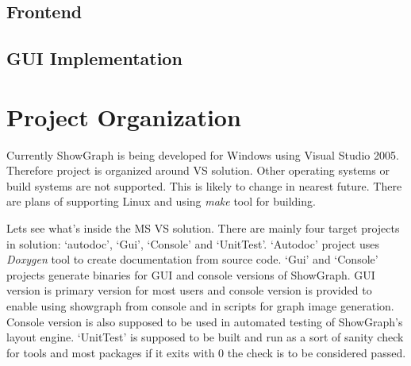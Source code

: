 \documentclass[11pt,twoside,a4paper]{article}
\begin{document}

\subsection{Frontend}


\subsection{GUI Implementation}


\section{Project Organization}
Currently ShowGraph is being developed for Windows using Visual Studio 2005. Therefore project is organized around VS solution. Other operating systems or build systems are not supported. This is likely to change in nearest future. There are plans of supporting Linux and using \emph{make} tool for building.

Lets see what's inside the MS VS solution. There are mainly four target projects in solution: `autodoc', `Gui', `Console' and `UnitTest'. `Autodoc' project uses \emph{Doxygen} tool to create documentation from source code. `Gui' and `Console' projects generate binaries for GUI and console versions of ShowGraph. GUI version is primary version for most users and console version is provided to enable using showgraph from console and in scripts for graph image generation. Console version is also supposed to be used in automated testing of ShowGraph's layout engine. `UnitTest' is supposed to be built and run as a sort of sanity check for tools and most packages if it exits with 0 the check is to be considered passed.
\end{document}
